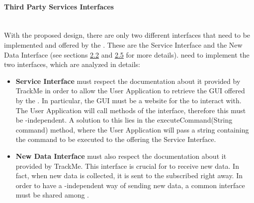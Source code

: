\documentclass[../../DD.tex]{subfiles}
\begin{document}
	\paragraph{Third Party Services Interfaces}\mbox{}\\
	\indent With the proposed design, there are only two different interfaces that need to be implemented and offered by the . These are the Service Interface and the New Data Interface (see sections \hyperref[sect:2.2]{2.2} and \hyperref[sect:2.5]{2.5} for more details).
	 need to implement the two interfaces, which are analyzed in details:
	\begin{itemize}
		\item \textbf{Service Interface} must respect the documentation about it provided by TrackMe in order to allow the User Application to retrieve the GUI offered by the . In particular, the GUI must be a website for the  to interact with. The User Application will call methods of the interface, therefore this must be -independent. A solution to this lies in the executeCommand(String command) method, where the User Application will pass a string containing the command to be executed to the  offering the Service Interface.
		\item \textbf{New Data Interface} must also respect the documentation about it provided by TrackMe. This interface is crucial for  to receive new data. In fact, when new data is collected, it is sent to the subscribed  right away. In order to have a -independent way of sending new data, a common interface must be shared among .
	\end{itemize}
\end{document}
